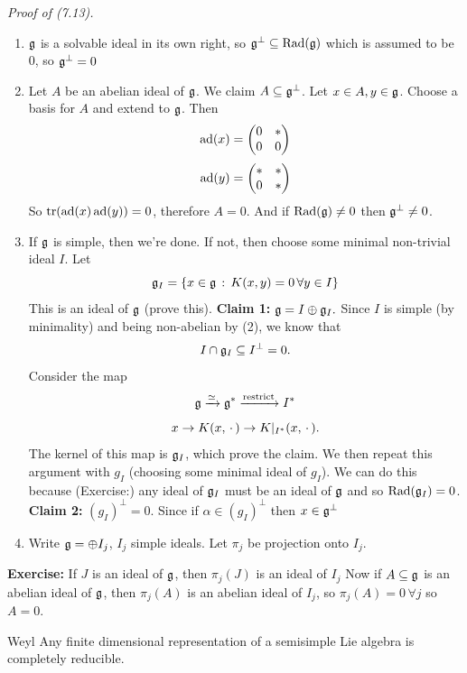 \documentclass{article}
\begin{document}
\endproof
\textit{Proof of (7.13). }\begin{enumerate}
    \item[$(2) \Rightarrow (3)$:] $\mathfrak{g}$ is a solvable ideal in its own right, so $\mathfrak{g}^{\perp} \subseteq \operatorname{Rad}(\mathfrak{g})$ which is assumed to be $0$, so $\mathfrak{g}^{\perp}=0$
    \item[$(3) \Rightarrow (2)$:] Let $A$ be an abelian ideal of $\mathfrak{g}$. We claim $A \subseteq \mathfrak{g}^{\perp}$. Let $x \in A, y \in \mathfrak{g}$. Choose a basis for $A$ and extend to $\mathfrak{g}$. Then \[ \operatorname{ad}(x)= \begin{pmatrix}
        0 & *\\
        0& 0
    \end{pmatrix}\] 
    \[ \operatorname{ad}(y) = \begin{pmatrix}
        * & *\\
        0 & *
    \end{pmatrix}\] So $\tr(\operatorname{ad}(x)\operatorname{ad}(y))=0$, therefore $A=0$. And if $\operatorname{Rad}(\mathfrak{g}) \neq 0$ then $\mathfrak{g}^{\perp}\neq 0$.
    \item[(2)\, \& (3) $\Rightarrow $(1):] If $\mathfrak{g}$ is simple, then we're done. If not, then choose some minimal non-trivial ideal $I$. Let \[ \mathfrak{g}_{I} = \{ x \in \mathfrak{g} \, : \, K(x,y)=0 \, \forall y \in I \}\] This is an ideal of $\mathfrak{g}$ (prove this). \gap \textbf{Claim 1: } $\mathfrak{g} = I \oplus \mathfrak{g}_{I}.$ \gap Since $I$ is simple (by minimality) and being non-abelian by (2), we know that \[ I \cap \mathfrak{g}_{I} \subseteq I^{\perp} = 0.\] Consider the map \[ \mathfrak{g} \xrightarrow{\simeq} \mathfrak{g}^{*} \xrightarrow{\text{restrict}} I^{*}\] \[ x \to K(x, \, \cdot \,) \to K|_{I^{*}}(x, \, \cdot \,).\] The kernel of this map is $\mathfrak{g}_{I}$, which prove the claim. We then repeat this argument with $g_{I}$ (choosing some minimal ideal of $g_{I}$). We can do this because (Exercise:) any ideal of $\mathfrak{g}_{I}$ must be an ideal of $\mathfrak{g}$ and so $\operatorname{Rad}(\mathfrak{g}_{I})=0$. \gap \textbf{Claim 2:} $(g_{I})^{\perp}=0$. Since if $\alpha \in (g_{I})^{\perp}$ then $x \in \mathfrak{g}^{\perp}$
    
    \item[(1) $\Rightarrow$ (2)] Write $\mathfrak{g} = \oplus I_{j}$, $I_{j}$ simple ideals. Let $\pi_{j}$ be projection onto $I_{j}$. 
\end{enumerate}
\endproof
\newlec \textbf{Exercise: } If $J$ is an ideal of $\mathfrak{g}$, then $\pi_{j}(J)$ is an ideal of $I_{j}$\gap 
Now if $A \subseteq \mathfrak{g}$ is an abelian ideal of $\mathfrak{g}$, then $\pi_{j}(A)$ is an abelian ideal of $I_{j}$, so $\pi_{j}(A)=0 \, \forall j$ so $A=0$.
\begin{fancythm}{Weyl}
    Any finite dimensional representation of a semisimple Lie algebra is completely reducible.
\end{fancythm}
\end{document}
